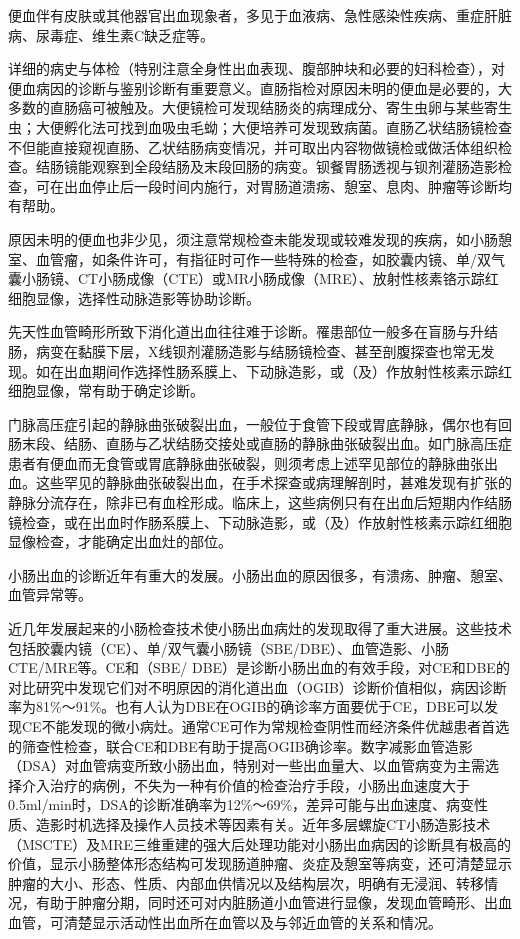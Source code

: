 便血伴有皮肤或其他器官出血现象者，多见于血液病、急性感染性疾病、重症肝脏病、尿毒症、维生素C缺乏症等。

详细的病史与体检（特别注意全身性出血表现、腹部肿块和必要的妇科检查），对便血病因的诊断与鉴别诊断有重要意义。直肠指检对原因未明的便血是必要的，大多数的直肠癌可被触及。大便镜检可发现结肠炎的病理成分、寄生虫卵与某些寄生虫；大便孵化法可找到血吸虫毛蚴；大便培养可发现致病菌。直肠乙状结肠镜检查不但能直接窥视直肠、乙状结肠病变情况，并可取出内容物做镜检或做活体组织检查。结肠镜能观察到全段结肠及末段回肠的病变。钡餐胃肠透视与钡剂灌肠造影检查，可在出血停止后一段时间内施行，对胃肠道溃疡、憩室、息肉、肿瘤等诊断均有帮助。

原因未明的便血也非少见，须注意常规检查未能发现或较难发现的疾病，如小肠憩室、血管瘤，如条件许可，有指征时可作一些特殊的检查，如胶囊内镜、单/双气囊小肠镜、CT小肠成像（CTE）或MR小肠成像（MRE）、放射性核素铬示踪红细胞显像，选择性动脉造影等协助诊断。

先天性血管畸形所致下消化道出血往往难于诊断。罹患部位一般多在盲肠与升结肠，病变在黏膜下层，X线钡剂灌肠造影与结肠镜检查、甚至剖腹探查也常无发现。如在出血期间作选择性肠系膜上、下动脉造影，或（及）作放射性核素示踪红细胞显像，常有助于确定诊断。

门脉高压症引起的静脉曲张破裂出血，一般位于食管下段或胃底静脉，偶尔也有回肠末段、结肠、直肠与乙状结肠交接处或直肠的静脉曲张破裂出血。如门脉高压症患者有便血而无食管或胃底静脉曲张破裂，则须考虑上述罕见部位的静脉曲张出血。这些罕见的静脉曲张破裂出血，在手术探查或病理解剖时，甚难发现有扩张的静脉分流存在，除非已有血栓形成。临床上，这些病例只有在出血后短期内作结肠镜检查，或在出血时作肠系膜上、下动脉造影，或（及）作放射性核素示踪红细胞显像检查，才能确定出血灶的部位。

小肠出血的诊断近年有重大的发展。小肠出血的原因很多，有溃疡、肿瘤、憩室、血管异常等。

近几年发展起来的小肠检查技术使小肠出血病灶的发现取得了重大进展。这些技术包括胶囊内镜（CE）、单/双气囊小肠镜（SBE/DBE）、血管造影、小肠CTE/MRE等。CE和（SBE/
DBE）是诊断小肠出血的有效手段，对CE和DBE的对比研究中发现它们对不明原因的消化道出血（OGIB）诊断价值相似，病因诊断率为81\%～91\%。也有人认为DBE在OGIB的确诊率方面要优于CE，DBE可以发现CE不能发现的微小病灶。通常CE可作为常规检查阴性而经济条件优越患者首选的筛查性检查，联合CE和DBE有助于提高OGIB确诊率。数字减影血管造影（DSA）对血管病变所致小肠出血，特别对一些出血量大、以血管病变为主需选择介入治疗的病例，不失为一种有价值的检查治疗手段，小肠出血速度大于0.5ml/min时，DSA的诊断准确率为12\%～69\%，差异可能与出血速度、病变性质、造影时机选择及操作人员技术等因素有关。近年多层螺旋CT小肠造影技术（MSCTE）及MRE三维重建的强大后处理功能对小肠出血病因的诊断具有极高的价值，显示小肠整体形态结构可发现肠道肿瘤、炎症及憩室等病变，还可清楚显示肿瘤的大小、形态、性质、内部血供情况以及结构层次，明确有无浸润、转移情况，有助于肿瘤分期，同时还可对内脏肠道小血管进行显像，发现血管畸形、出血血管，可清楚显示活动性出血所在血管以及与邻近血管的关系和情况。

